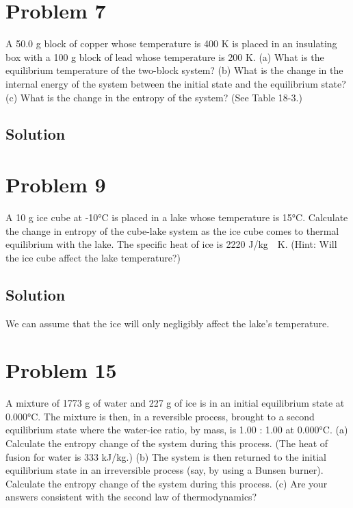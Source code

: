 \documentclass[12pt]{article}
\begin{document}
    \pagebreak
    \section{Problem 7}
        A 50.0 g block of copper whose temperature is 400 K is placed in an insulating box with a 100 g block of lead whose temperature is 200 K. 
        (a) What is the equilibrium temperature of the two-block system? 
        (b) What is the change in the internal energy of the system between the initial state and the equilibrium state? 
        (c) What is the change in the entropy of the system? (See Table 18-3.)

        \subsection{Solution}

    \pagebreak
    \section{Problem 9}
        A 10 g ice cube at -10\unit{\celsius} is placed in a lake whose temperature is 15°C. 
        Calculate the change in entropy of the cube-lake system as the ice cube comes to thermal equilibrium with the lake. 
        The specific heat of ice is 2220 \unit{\joule/\kilo\gram\cdot\kelvin}. 
        (Hint: Will the ice cube affect the lake temperature?)

        \subsection{Solution}
            We can assume that the ice will only negligibly affect the lake's temperature.

    \pagebreak
    \section{Problem 15}
        A mixture of 1773 g of water and 227 g of ice is in an initial equilibrium state at 0.000\unit{\celsius}. 
        The mixture is then, in a reversible process, brought to a second equilibrium state where the water-ice ratio, by mass, is 1.00 : 1.00 at 0.000\unit{\celsius}. 
        (a) Calculate the entropy change of the system during this process. 
        (The heat of fusion for water is 333 kJ/kg.) 
        (b) The system is then returned to the initial equilibrium state in an irreversible process (say, by using a Bunsen burner). 
        Calculate the entropy change of the system during this process. 
        (c) Are your answers consistent with the second law of thermodynamics?
\end{document}
